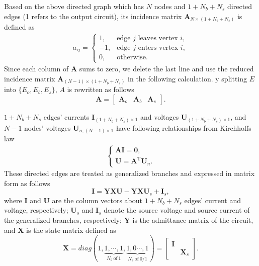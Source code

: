 \documentclass{article}
\def\T{\mathrm{T}}
\begin{document}
Based on the above directed graph which has $N$ nodes and $1+N_b+N_s$ directed edges (1 refers to the output circuit), its incidence matrix $\bm{A}_{N\times (1+N_b+N_s)}$ is defined as
\begin{align}\label{eq:A}
    a_{ij}=
    \begin{cases}
        1,  & \text{edge  $j$ leaves vertex $i$},\\
        -1, & \text{edge $j$ enters vertex $i$},\\
        0,  & \text{otherwise}.
    \end{cases}
\end{align}
Since each column of $\bm{A}$ sums to zero, we delete the last line and use the reduced incidence matrix $\bm{A}_{(N-1)\times(1+N_b+N_s)}$ in the following calculation.
y splitting $E$ into $\{E_o, E_b, E_s\}$, $A$ is rewritten as follows
\begin{equation}
    \bm{A} =
    \begin{bmatrix}
        \bm{A}_o & \bm{A}_b & \bm{A}_s
    \end{bmatrix}.
\end{equation}


$1+N_b+N_s$ edges' currents $\bm{I}_{(1+N_b+N_s)\times 1}$ and voltages $\bm{U}_{(1+N_b+N_s)\times 1}$, and $N-1$ nodes' voltages $\bm{U}_{n, (N-1)\times 1}$ have following relationships from Kirchhoffs law
\begin{align}\label{eq:Kirchhoffs_law}
    \begin{cases}
        \bm{A} \bm{I} = \bm{0}, \\
        \bm{U}        = \bm{A}^\T \bm{U}_n.
    \end{cases}
\end{align}
These directed edges are treated as generalized branches and expressed in matrix form as follows
\begin{equation}\label{eq:generalized_branches}
    \bm{I} = \bm{Y}\bm{X} \bm{U} - \bm{Y}\bm{X} \bm{U}_s +\bm{I}_s,
\end{equation}
where $\bm{I}$ and $\bm{U}$ are the column vectors about $1+N_b+N_s$ edges' current and voltage, respectively;
$\bm{U}_s$ and $\bm{I}_s$ denote the source voltage and source current of the generalized branches, respectively;
$\bm{Y}$ is the admittance matrix of the circuit, and $\bm{X}$ is the state matrix defined as
\begin{equation}\label{eq:X}
    \bm{X} = diag(
    1,
    \underbrace{1, \cdots, 1}_{N_b~\text{of}~1},
    \underbrace{1, 0 \cdots, 1}_{N_s~\text{of}~0/1}
    )
    =\begin{bmatrix}
        \bm{I} &\\
        & \bm{X}_s
    \end{bmatrix}.
\end{equation}
\end{document}
